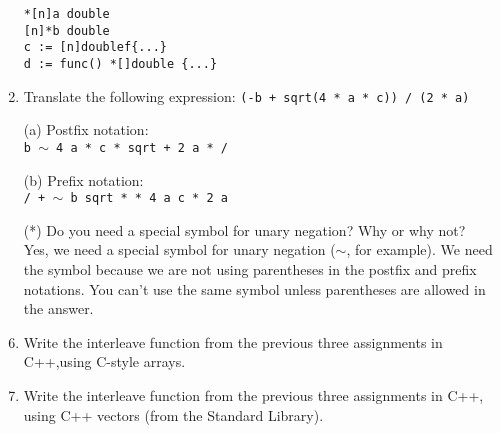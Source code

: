 \documentclass{article}
\begin{document}
\begin{enumerate}
\begin{verbatim}
*[n]a double
[n]*b double
c := [n]doublef{...}
d := func() *[]double {...}
\end{verbatim}
\pagebreak
\item Translate the following expression: \texttt{(-b + sqrt(4 * a * c)) / (2 * a)}
    \item[(a)]Postfix notation: \\\texttt{b \(\sim\) 4 a * c * sqrt + 2 a * /} \\
    \item[(b)]Prefix notation: \\\texttt{/ + \(\sim\) b sqrt * * 4 a c * 2 a} \\ 
    \item[(*)] Do you need a special symbol for unary negation? Why or why not? \\
    Yes, we need a special symbol for unary negation (\(\sim\), for example). We need the symbol because we are not using parentheses in the postfix and prefix notations. You can't use the same symbol unless parentheses are allowed in the answer.
\pagebreak
\item Write the interleave function from the previous three assignments in C++,using C-style arrays.

\pagebreak
\item Write the interleave function from the previous three assignments in C++, using C++ vectors (from the Standard Library).

\pagebreak
\end{enumerate}
\end{document}
